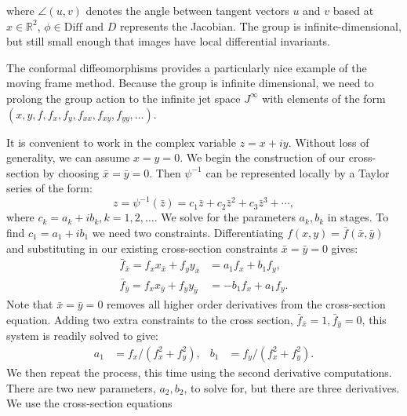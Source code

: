 \documentclass[review,onefignum,onetabnum]{siamonline190516}
\begin{document}
\noindent where $\angle(u, v)$ denotes the angle between tangent vectors
$u$ and $v$ based at $x \in \mathbb{R}^2$, $\phi \in \textrm{Diff}$ and $D$
represents the Jacobian. The group is infinite-dimensional, but still small
enough that images have local differential invariants. 

The conformal diffeomorphisms provides a particularly nice example of the
moving frame method. Because the group is infinite dimensional, we need to
prolong the group action to the infinite jet space $J^{\infty}$ with
elements of the form $(x, y, f, f_x, f_y, f_{xx}, f_{xy}, f_{yy}, \ldots)$.

It is convenient to work in the complex variable $z = x + iy$. Without loss of
generality, we can assume $x = y = 0$. We begin the construction of our
cross-section by choosing $\bar{x} = \bar{y} = 0$. Then $\psi^{-1}$ 
can be represented locally by a Taylor series of the form:
\begin{equation*}
    z = \psi^{-1}(\bar{z}) = c_1 \bar{z} + c_2 \bar{z}^2 + c_3\bar{z}^3 + \cdots,
\end{equation*}
where $c_k = a_k + ib_k, k = 1, 2, \ldots$. We solve for the parameters
$a_k, b_k$ in stages.  To find $c_1 = a_1 + i b_1$ we need two constraints.
Differentiating $f(x, y) = \bar{f}(\bar{x}, \bar{y})$ and substituting in
our existing cross-section constraints $\bar{x} = \bar{y} = 0$ gives:
\begin{align*}
    \bar{f}_{\bar{x}} = f_x x_{\bar{x}} + f_y y_{\bar{x}} &= a_1 f_x + b_1
    f_y, \\
    \bar{f}_{\bar{y}} = f_x x_{\bar{y}} + f_y y_{\bar{y}} &= -b_1 f_x + a_1
    f_y. 
\end{align*}
Note that $\bar{x} = \bar{y} = 0$ removes all higher order derivatives from
the cross-section equation. Adding two extra constraints to the cross
section, $\bar{f}_{\bar{x}} = 1, \bar{f}_{\bar{y}} = 0$, this system is readily
solved to give:
\begin{equation*}
    \begin{aligned}
        a_1 &= f_x / (f_x^2 + f_y^2), &  b_1 &= f_y / (f_x^2 + f_y^2).
    \end{aligned}
\end{equation*}
We then repeat the process, this time using the second derivative
computations. There are two new parameters, $a_2, b_2$, to solve
for, but there are three derivatives. We use the cross-section equations
\end{document}
